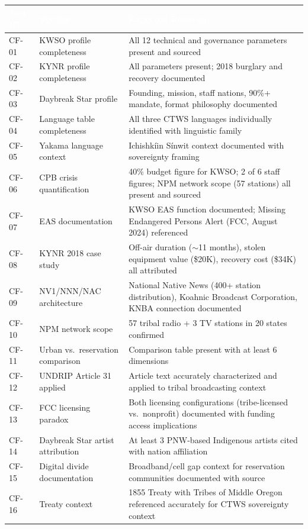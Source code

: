 \documentclass[11pt,letterpaper]{article}
\newcommand{\tableheader}[1]{\textbf{\sffamily\textcolor{white}{#1}}}
\begin{document}
\begin{center}
\begin{tabularx}{\textwidth}{C{1.2cm}L{3.5cm}X}
\toprule
{}
\tableheader{Test ID} & \tableheader{Verifies} & \tableheader{Expected Behavior} \\
\midrule
CF-01 & KWSO profile completeness & All 12 technical and governance parameters present and sourced \\
CF-02 & KYNR profile completeness & All parameters present; 2018 burglary and recovery documented \\
CF-03 & Daybreak Star profile & Founding, mission, staff nations, 90\%+ mandate, format philosophy documented \\
CF-04 & Language table completeness & All three CTWS languages individually identified with linguistic family \\
CF-05 & Yakama language context & Ichishkíin Sínwit context documented with sovereignty framing \\
CF-06 & CPB crisis quantification & 40\% budget figure for KWSO; 2 of 6 staff figures; NPM network scope (57 stations) all present and sourced \\
CF-07 & EAS documentation & KWSO EAS function documented; Missing Endangered Persons Alert (FCC, August 2024) referenced \\
CF-08 & KYNR 2018 case study & Off-air duration ($\sim$11 months), stolen equipment value (\$20K), recovery cost (\$34K) all attributed \\
CF-09 & NV1/NNN/NAC architecture & National Native News (400+ station distribution), Koahnic Broadcast Corporation, KNBA connection documented \\
CF-10 & NPM network scope & 57 tribal radio + 3 TV stations in 20 states confirmed \\
CF-11 & Urban vs.\ reservation comparison & Comparison table present with at least 6 dimensions \\
CF-12 & UNDRIP Article 31 applied & Article text accurately characterized and applied to tribal broadcasting context \\
CF-13 & FCC licensing paradox & Both licensing configurations (tribe-licensed vs.\ nonprofit) documented with funding access implications \\
CF-14 & Daybreak Star artist attribution & At least 3 PNW-based Indigenous artists cited with nation affiliation \\
CF-15 & Digital divide documentation & Broadband/cell gap context for reservation communities documented with source \\
CF-16 & Treaty context & 1855 Treaty with Tribes of Middle Oregon referenced accurately for CTWS sovereignty context \\
\bottomrule
\end{tabularx}
\end{center}
\end{document}
